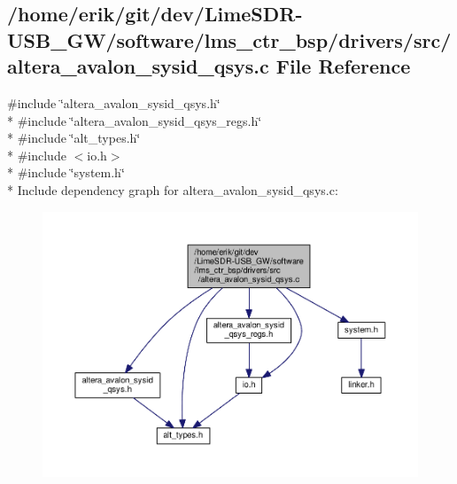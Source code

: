 \subsection{/home/erik/git/dev/\+Lime\+S\+D\+R-\/\+U\+S\+B\+\_\+\+G\+W/software/lms\+\_\+ctr\+\_\+bsp/drivers/src/altera\+\_\+avalon\+\_\+sysid\+\_\+qsys.c File Reference}
\label{altera__avalon__sysid__qsys_8c}
{\ttfamily \#include \char`\"{}altera\+\_\+avalon\+\_\+sysid\+\_\+qsys.\+h\char`\"{}}\\*
{\ttfamily \#include \char`\"{}altera\+\_\+avalon\+\_\+sysid\+\_\+qsys\+\_\+regs.\+h\char`\"{}}\\*
{\ttfamily \#include \char`\"{}alt\+\_\+types.\+h\char`\"{}}\\*
{\ttfamily \#include $<$io.\+h$>$}\\*
{\ttfamily \#include \char`\"{}system.\+h\char`\"{}}\\*
Include dependency graph for altera\+\_\+avalon\+\_\+sysid\+\_\+qsys.\+c\+:
\nopagebreak
\begin{figure}[H]
\begin{center}
\leavevmode
\includegraphics[width=350pt]{d3/d29/altera__avalon__sysid__qsys_8c__incl}
\end{center}
\end{figure}
